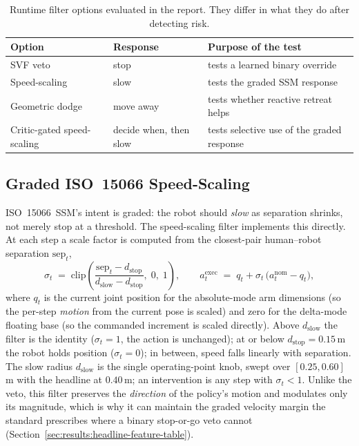 \documentclass[11pt,a4paper]{report}
\newcommand{\ssm}{SSM}
\newcommand{\iso}{ISO~15066}
\begin{document}
\begin{table}[htbp]
\centering
\small
\caption{Runtime filter options evaluated in the report. They differ
in what they do after detecting risk.}
\label{tab:runtime-options}
\begin{tabular}{lll}
\toprule
Option & Response & Purpose of the test \\
\midrule
SVF veto & stop & tests a learned binary override \\
Speed-scaling & slow & tests the graded \ssm{} response \\
Geometric dodge & move away & tests whether reactive retreat helps \\
Critic-gated speed-scaling & decide when, then slow & tests selective use of the graded response \\
\bottomrule
\end{tabular}
\end{table}

\subsection{Graded \iso{} Speed-Scaling}
\label{sec:method:filter:speedscale}

\iso{}~\ssm{}'s intent is graded: the robot should \emph{slow} as
separation shrinks, not merely stop at a threshold. The speed-scaling
filter implements this directly. At each step a scale factor is
computed from the closest-pair human--robot separation
$\mathrm{sep}_t$,
\begin{equation}
  \sigma_t \;=\; \mathrm{clip}\!\left(
    \frac{\mathrm{sep}_t - d_{\mathrm{stop}}}
         {d_{\mathrm{slow}} - d_{\mathrm{stop}}},\; 0,\; 1\right),
  \qquad
  a^{\mathrm{exec}}_t \;=\; q_t + \sigma_t \,
    \bigl(a^{\mathrm{nom}}_t - q_t\bigr),
  \label{eq:speed-scale}
\end{equation}
where $q_t$ is the current joint position for the absolute-mode arm
dimensions (so the per-step \emph{motion} from the current pose is
scaled) and zero for the delta-mode floating base (so the commanded
increment is scaled directly). Above $d_{\mathrm{slow}}$ the filter
is the identity ($\sigma_t = 1$, the action is unchanged); at or
below $d_{\mathrm{stop}} = 0.15$\,m the robot holds position
($\sigma_t = 0$); in between, speed falls linearly with separation.
The slow radius $d_{\mathrm{slow}}$ is the single operating-point
knob, swept over $[0.25, 0.60]$\,m with the headline at $0.40$\,m;
an intervention is any step with $\sigma_t < 1$. Unlike the veto,
this filter preserves the \emph{direction} of the policy's motion
and modulates only its magnitude, which is why it can maintain the
graded velocity margin the standard prescribes where a binary
stop-or-go veto cannot
(Section~\ref{sec:results:headline-feature-table}).
\end{document}
